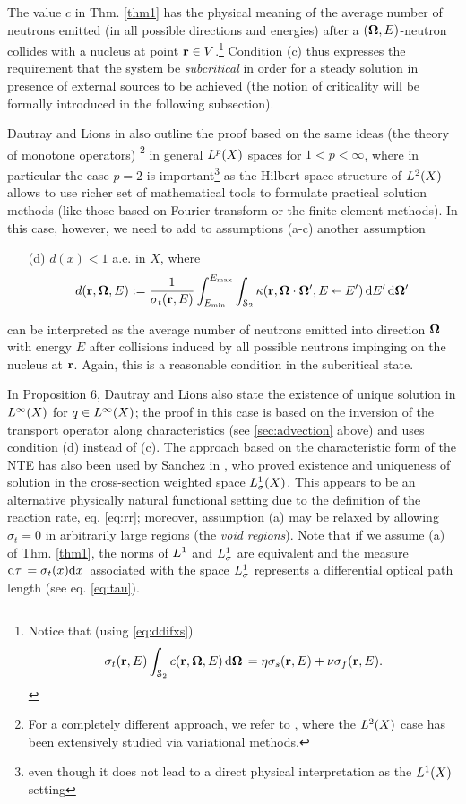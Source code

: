 The value $c$ in Thm. \ref{thm1} has the physical meaning of the average number of neutrons emitted (in all possible
directions and energies) after a $(\bomega, E)$-neutron collides with a nucleus at point $\br\in
V$.\footnote{\label{ftn:c}Notice that (using \eqref{eq:ddifxs})
$$
	\sigma_t(\br,E)\int_{\Sphere} c(\br,\bomega, E)\,\d{\bomega} = \eta\sigma_s(\br,E) +
	\nu\sigma_f(\br,E).
$$}
Condition (c) thus expresses the requirement that the system be \textit{subcritical} in order for a
steady solution in presence of external sources to be achieved (the notion of criticality will be formally introduced in the following
subsection).

Dautray and Lions in 
\cite[\S2, Chap. XXI]{DautrayLions} also outline the proof based on the same ideas (the theory of monotone operators)
\footnote{For a completely different approach, we refer to \cite[Chap. 3]{Agoshkov}, where the $\Lp[2](X)$ case has been
extensively studied via variational methods.} in
general $\Lp(X)$ spaces for $1 < p < \infty$, where in particular the case $p = 2$ is important\footnote{even though it does not lead to a direct 
physical interpretation as the $\Lp[1](X)$ setting} as the Hilbert space structure of $\Lp[2](X)$ allows to use richer 
set of mathematical tools to formulate practical solution methods (like those based on Fourier transform or the finite 
element methods). In this case, however, we need to add to assumptions (a-c) another assumption
\begin{enumerate}
  \item[(d)] $d(x) < 1$ a.e. in $X$, where
$$ d(\br,\bomega,E) := 
  \frac{1}{\sigma_t(\br,E)}\int_{\Emin}^{\Emax}\int_{\Sphere} \kappa(\br,\bomega\cdot\bomega',
	    E\sla E')\,\d{E'}\d{\bomega'}
$$
\end{enumerate}
can be interpreted as the average number of neutrons emitted into direction $\bomega$ with energy $E$ after
collisions induced by all possible neutrons impinging on the nucleus at $\br$. Again, this is a reasonable condition in
the subcritical state.

In Proposition 6, Dautray and Lions also 
state the existence of unique solution in $\Lp[\infty](X)$ for $q\in \Lp[\infty](X)$; the proof in this case is based on
 the inversion of the transport operator along characteristics (see \ref{sec:advection} above) and uses condition (d)
 instead of (c).
 The approach based on the characteristic form of the NTE has also been used by Sanchez in \cite{Sanchez3}, who proved  
 existence and uniqueness of solution in the cross-section weighted space $\Lp[1]_{\sigma}(X)$.
 This appears to be an alternative physically natural functional setting due to the definition of the reaction rate, eq. 
 \eqref{eq:rr}; moreover, assumption (a) may be relaxed by allowing $\sigma_t = 0$ in arbitrarily large regions 
  (the \textit{void regions}). Note that if we assume (a) of Thm. \ref{thm1}, the norms of $\Lp[1]$ and
  $\Lp[1]_{\sigma}$ are equivalent and the measure $\d{\tau} = \sigma_t(x) \d{x}$ associated with the space
  $\Lp[1]_{\sigma}$ represents a differential optical path length (see eq. \eqref{eq:tau}).
  
